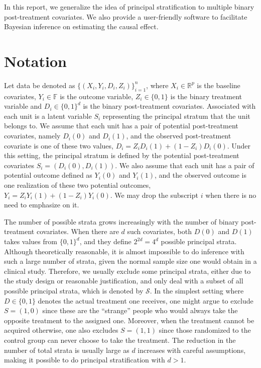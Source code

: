 \documentclass{article}
\begin{document}
In this report, we generalize the idea of principal stratification to multiple binary post-treatment covariates. We also provide a user-friendly software to facilitate Bayesian inference on estimating the causal effect.

\section{Notation}

Let data be denoted as $\{(X_i, Y_i, D_i, Z_i)\}_{i=1}^n$, where $X_i\in \mathbb{R}^p$ is the baseline covariates, $Y_i \in \mathbb{F}$ is the outcome variable, $Z_i \in \{0, 1\}$ is the binary treatment variable and $D_i \in \{0, 1\}^d$ is the binary post-treatment covariates. Associated with each unit is a latent variable $S_i$ representing the principal stratum that the unit belongs to. We assume that each unit has a pair of potential post-treatment covariates, namely $D_i(0)$ and $D_i(1)$, and the observed post-treatment covariate is one of these two values, $D_i = Z_i D_i(1) + (1 - Z_i) D_i(0)$. Under this setting, the principal stratum is defined by the potential post-treatment covariates $S_i = (D_i(0), D_i(1))$. We also assume that each unit has a pair of potential outcome defined as $Y_i(0)$ and $Y_i(1)$, and the observed outcome is one realization of these two potential outcomes, $Y_i = Z_i Y_i(1) + (1 - Z_i)Y_i(0)$. We may drop the subscript $i$ when there is no need to emphasize on it.

The number of possible strata grows increasingly with the number of binary post-treatment covariates. When there are $d$ such covariates, both $D(0)$ and $D(1)$ takes values from $\{0, 1\}^{d}$, and they define $2^{2d} = 4^d$ possible principal strata. Although theoretically reasonable, it is almost impossible to do inference with such a large number of strata, given the normal sample size one would obtain in a clinical study. Therefore, we usually exclude some principal strata, either due to the study design or reasonable justification, and only deal with a subset of all possible principal strata, which is denoted by $\mathcal{S}$. In the simplest setting where $D\in \{0, 1\}$ denotes the actual treatment one receives, one might argue to exclude $S = (1, 0)$ since these are the ``strange'' people who would always take the opposite treatment to the assigned one. Moreover, when the treatment cannot be acquired otherwise, one also excludes $S = (1, 1)$ since those randomized to the control group can never choose to take the treatment. The reduction in the number of total strata is usually large as $d$ increases with careful assumptions, making it possible to do principal stratification with $d > 1$.
\end{document}
